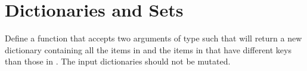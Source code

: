 \documentclass[letterpaper,10pt,english]{sphinxmanual}
\begin{document}
\section{Dictionaries and Sets}
\label{\detokenize{Review/Review Questions:dictionaries-and-sets}}
 Define a function  that accepts two arguments of type  such that  will return a new dictionary containing all the items in  and the items in  that have different keys than those in .  The input dictionaries should not be mutated.

\begin{sphinxVerbatim}[commandchars=\\\{\}]
  
      
\end{sphinxVerbatim}
\end{document}
